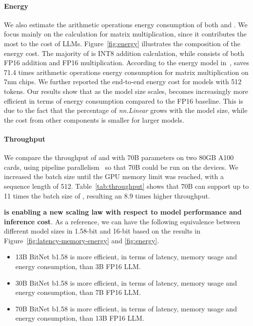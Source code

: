 \paragraph{Energy}

We also estimate the arithmetic operations energy consumption of both \our{} and \llama{}.
We focus mainly on the calculation for matrix multiplication, since it
contributes the most to the cost of LLMs. Figure~\ref{fig:energy} illustrates the composition of the energy cost. The majority of \our{} is INT8 addition calculation, while \llama{} consists of both FP16 addition and FP16 multiplication. According to the energy model in~\cite{energycost, pokebnn}, \our{} saves 71.4 times arithmetic operations energy consumption for matrix multiplication on 7nm chips. We further reported the end-to-end energy cost for models with 512 tokens. Our results show that as the model size scales, \our{} becomes increasingly more efficient in terms of energy consumption compared to the FP16 \llama{} baseline. This is due to the fact that the percentage of \emph{nn.Linear} grows with the model size, while the cost from other components is smaller for larger models.



\paragraph{Throughput}




We compare the throughput of \our{} and \llama{} with 70B parameters on two 80GB A100 cards, using pipeline parallelism~\cite{gpipe} so that \llama{} 70B could be run on the devices. We increased the batch size until the GPU memory limit was reached, with a sequence length of 512. Table~\ref{tab:throughput} shows that \our{} 70B can support up to 11 times the batch size of \llama{}, resulting an 8.9 times higher throughput.

\textbf{\our{} is enabling a new scaling law with respect to model performance and inference cost}. As a reference, we can have the following equivalence between different model sizes in 1.58-bit and 16-bit based on the results in Figure~\ref{fig:latency-memory-energy} and \ref{fig:energy}.
\begin{itemize}
    \item 13B BitNet b1.58 is more efficient, in terms of latency, memory usage and energy consumption, than 3B FP16 LLM.
    \item 30B BitNet b1.58 is more efficient, in terms of latency, memory usage and energy consumption, than 7B FP16 LLM.
    \item 70B BitNet b1.58 is more efficient, in terms of latency, memory usage and energy consumption, than 13B FP16 LLM.
\end{itemize}


